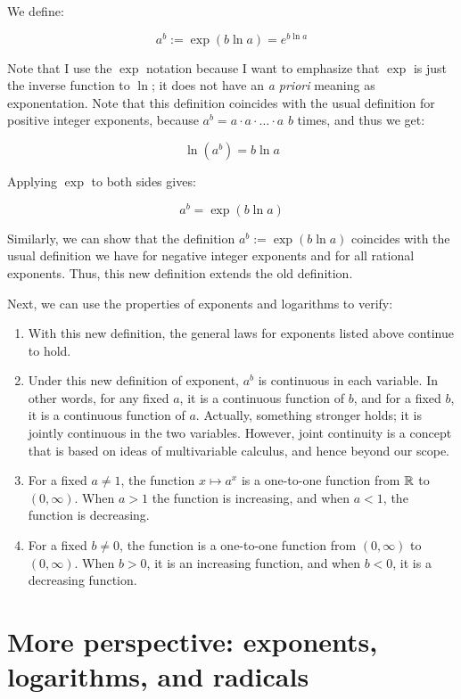 \documentclass[10pt]{amsart}
\begin{document}
We define:

$$a^b := \exp(b \ln a) = e^{b \ln a}$$

Note that I use the $\exp$ notation because I want to emphasize that
$\exp$ is just the inverse function to $\ln$; it does not have an {\em
a priori} meaning as exponentation. Note that this definition
coincides with the usual definition for positive integer exponents,
because $a^b = a \cdot a \cdot \dots \cdot a$ $b$ times, and thus we get:

$$\ln(a^b) = b \ln a$$

Applying $\exp$ to both sides gives:

$$a^b = \exp(b \ln a)$$

Similarly, we can show that the definition $a^b := \exp(b \ln a)$
coincides with the usual definition we have for negative integer
exponents and for all rational exponents. Thus, this new definition
extends the old definition.

Next, we can use the properties of exponents and logarithms to verify:

\begin{enumerate}
\item With this new definition, the general laws for exponents listed
  above continue to hold.
\item Under this new definition of exponent, $a^b$ is continuous in
  each variable. In other words, for any fixed $a$, it is a continuous
  function of $b$, and for a fixed $b$, it is a continuous function of
  $a$. Actually, something stronger holds; it is jointly continuous in
  the two variables. However, joint continuity is a concept that is
  based on ideas of multivariable calculus, and hence beyond our scope.
\item For a fixed $a \ne 1$, the function $x \mapsto a^x$ is a
  one-to-one function from $\mathbb{R}$ to $(0,\infty)$. When $a > 1$ the
  function is increasing, and when $a < 1$, the function is
  decreasing.
\item For a fixed $b \ne 0$, the function is a one-to-one function
  from $(0,\infty)$ to $(0,\infty)$. When $b > 0$, it is an increasing
  function, and when $b < 0$, it is a decreasing function.
\end{enumerate}

\section{More perspective: exponents, logarithms, and radicals}
\end{document}
